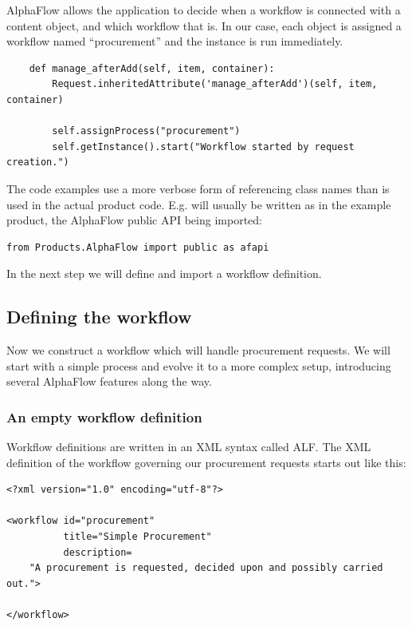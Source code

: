 AlphaFlow allows the application to decide when a workflow is connected with a
content object, and which workflow that is. In our case, each
 object is assigned a workflow named
``procurement'' and the instance is run immediately.
    
\begin{verbatim}
    def manage_afterAdd(self, item, container):
        Request.inheritedAttribute('manage_afterAdd')(self, item, container)

        self.assignProcess("procurement")
        self.getInstance().start("Workflow started by request creation.")
\end{verbatim}

\begin{notice}
  The code examples use a more verbose form of referencing class names than is
  used in the actual product code. E.g.
   will usually be written as
   in the example product, the AlphaFlow public API
  being imported:
\begin{verbatim}
from Products.AlphaFlow import public as afapi
\end{verbatim}
\end{notice}

In the next step we will define and import a workflow definition.
    
\subsection{Defining the workflow}

Now we construct a workflow which will handle procurement requests. We will
start with a simple process and evolve it to a more complex setup, introducing
several AlphaFlow features along the way.

\subsubsection{An empty workflow definition}

Workflow definitions are written in an XML syntax called ALF. The XML
definition of the workflow governing our procurement requests starts out like
this:

\begin{verbatim}
<?xml version="1.0" encoding="utf-8"?>

<workflow id="procurement"
          title="Simple Procurement"
          description=
    "A procurement is requested, decided upon and possibly carried out.">

</workflow>
\end{verbatim}

